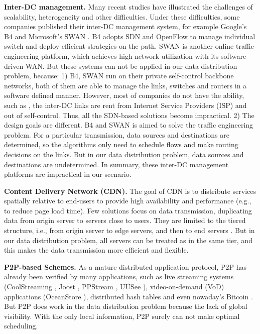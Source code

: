 \textbf{Inter-DC management.} Many recent studies \cite{chen2012design, kavulya2010analysis, mishra2010towards, reiss2012heterogeneity, sharma2011modeling, More, zhang2011characterizing} have illustrated the challenges of scalability, heterogeneity and other difficulties. Under these difficulties, some companies published their inter-DC management system, for example Google's B4 \cite{jain2013b4} and Microsoft's SWAN \cite{hong2013achieving}. B4 adopts SDN \cite{mckeown2009software} and OpenFlow \cite{OpenFlow,mckeown2008openflow} to manage individual switch and deploy efficient strategies on the path. SWAN is another online traffic engineering platform, which achieves high network utilization with its software-driven WAN. But these systems can not be applied in our data distribution problem, because: 1) B4, SWAN run on their private self-control backbone networks, both of them are able to manage the links, switches and routers in a software defined manner. However, most of companies do not have the ability, such as \company, the inter-DC links are rent from Internet Service Providers (ISP) and out of self-control. Thus, all the SDN-based solutions become impractical. 2) The design goals are different. B4 and SWAN is aimed to solve the traffic engineering problem. For a particular transmission, data sources and destinations are determined, so the algorithms only need to schedule flows and make routing decisions on the links. But in our data distribution problem, data sources and destinations are undetermined. In summary, these inter-DC management platforms are impractical in our scenario.

\textbf{Content Delivery Network (CDN).} The goal of CDN is to distribute services spatially relative to end-users to provide high availability and performance (e.g., to reduce page load time). Few solutions \cite{kostic2003bullet} focus on data transmission, duplicating data from origin server to servers close to users. They are limited to the tiered structure, i.e., from origin server to edge servers, and then to end servers . But in our data distribution problem, all servers can be treated as in the same tier, and this makes the data transmission more efficient and flexible.

\textbf{P2P-based Schemes.} As a mature distributed application protocol, P2P has already been verified by many applications, such as live streaming systems (CoolStreaming \cite{zhang2005coolstreaming}, Joost \cite{Joost}, PPStream \cite{PPStream}, UUSee \cite{UUSee}), video-on-demand (VoD) applications (OceanStore \cite{oceanstore}), distributed hash tables \cite{rhea2005opendht} and even nowaday's Bitcoin \cite{eyal2016bitcoin}. But P2P does work in the data distribution problem because the lack of global visibility. With the only local information, P2P surely can not make optimal scheduling. 